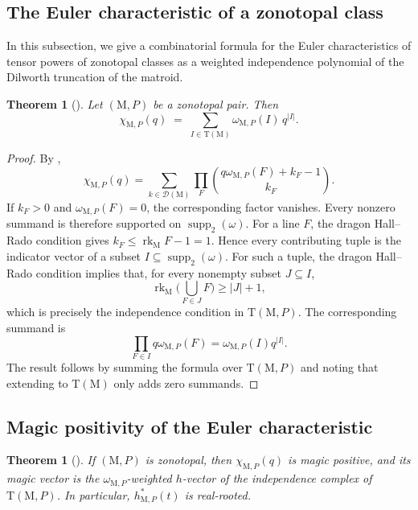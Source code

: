 \documentclass[11pt,a4paper,reqno]{amsart}
\theoremstyle{results}
\theoremstyle{definitions}
\newcommand{\abs}[1]{\left\lvert#1\right\rvert}
\newcommand{\rk}{\operatorname{rk}}
\newcommand{\M}{\mathrm{M}}
\newtheorem{theorem}[thm]{Theorem}
\DeclareMathOperator{\supp}{supp}
\newcommand{\hstar}{h^{*}}
\newcommand{\DT}{\mathrm{T}}      %
\newcommand{\DHR}{\mathcal{D}}
\begin{document}
\subsection{The Euler characteristic of a zonotopal class}
\label{sec:proof-formula}
In this subsection, we give a combinatorial formula for the Euler characteristics of tensor powers of zonotopal classes as a weighted independence polynomial of the Dilworth truncation of the matroid.


\begin{theorem}[]
  \label{thm:ec-zonotopal}
  Let $(\M, P)$ be a zonotopal pair.  Then
  \[
  \chi_{\M,P}(q) \;=\; \sum_{I \in \DT(\M)} \omega_{\M,P}(I)\, q^{\abs{I}} .
  \]
\end{theorem}

\begin{proof}
By ,
\[
 \chi_{\M,P}(q)=\sum_{k\in\DHR(\M)}
 \prod_F\binom{q\omega_{\M,P}(F)+k_F-1}{k_F}.
\]
If $k_F>0$ and $\omega_{\M,P}(F)=0$, the corresponding factor vanishes.
Every nonzero summand is therefore supported on $\supp_2(\omega)$.
For a line $F$, the dragon Hall--Rado condition gives
$k_F\leqslant\rk_{\M}F-1=1$. Hence every contributing tuple is the
indicator vector of a subset $I\subseteq\supp_2(\omega)$.
For such a tuple, the dragon Hall--Rado condition implies that, for every nonempty subset $J\subseteq I$,
\[
 \rk_{\M}\Big(\bigcup_{F\in J}F\Big)\geqslant |J|+1,
\]
which is precisely the independence condition in $\DT(\M,P)$.
The corresponding summand is
\[
\prod_{F\in I}q\omega_{\M,P}(F)=\omega_{\M,P}(I)q^{|I|}.
\]
The result follows by summing the formula over $\DT(\M,P)$ and noting that extending to $\DT(\M)$ only adds zero summands. 
\end{proof}

\subsection{Magic positivity of the Euler characteristic}
\label{sec:proof-magic}
\begin{theorem}[]\label{thm:magic-zonotopal}
  If $(\M, P)$ is zonotopal, then $\chi_{\M,P}(q)$ is magic positive, and
  its magic vector is the $\omega_{\M, P}$-weighted $h$-vector of the independence complex of $\DT(\M,P)$.  In
  particular, $\hstar_{\M,P}(t)$ is real-rooted.
\end{theorem}
\end{document}
